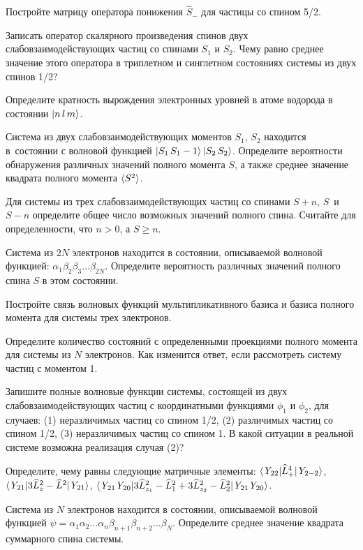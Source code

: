 \par
{} Постройте матрицу оператора понижения $\widehat{S}_{-}$ для частицы со спином 5/2.
\par
{} Записать оператор скалярного произведения спинов двух слабовзаимодействующих частиц со спинами $S_1$ и $S_2$. Чему равно среднее значение этого оператора в триплетном и синглетном состояниях системы из двух спинов 1/2?
\par
{} Определите кратность вырождения электронных уровней в атоме водорода в состоянии $\ket{n\,l\,m} $.
\par
{} Система из двух слабовзаимодействующих моментов $S_1$, $S_2$ находится в~состоянии с волновой функцией $\ket{S_1\,S_1-1}\ket{S_2\,S_2}$. Определите вероятности обнаружения различных значений полного момента $S$, а также среднее значение квадрата полного момента $\braket{S^2}$.
\par
{} Для системы из трех слабовзаимодействующих частиц со спинами $S + n$, $S$~и~$S - n$ определите общее число возможных значений полного спина. Считайте для определенности, что $n > 0$, а $S \geq n$.
\par
{} Система из $2N$ электронов находится в состоянии, описываемой волновой функцией: $\alpha_1\beta_2\beta_3 \ldots \beta_{2N}$. Определите вероятность различных значений полного спина $S$ в этом состоянии.
\par
{} Постройте связь волновых функций мультипликативного базиса и базиса полного момента для системы трех электронов.
\par
{} Определите количество состояний с определенными проекциями полного момента для системы из $N$ электронов. Как изменится ответ, если рассмотреть систему частиц с моментом 1.
\par
{} Запишите полные волновые функции системы, состоящей из двух слабовзаимодействующих частиц с координатными функциями $\phi_1$ и $\phi_2$, для случаев: (1) неразличимых частиц со спином 1/2, (2) различимых частиц со спином 1/2, (3) неразличимых частиц со спином 1. В какой ситуации в реальной системе возможна реализация случая (2)?
\par
{} Определите, чему равны следующие матричные элементы: $\braket{\textit{Y}_{22}|\widehat L^4_+|\textit{Y}_{2-2}}$, $\braket{\textit{Y}_{21}|3\widehat L_{z}^2- \widehat L^2|\textit{Y}_{21}}$, $\braket{\textit{Y}_{21}\textit{Y}_{20}|3 \widehat L_{z_1}^2- \widehat L_1^2+3 \widehat L_{z_2}^2- \widehat L_2^2|\textit{Y}_{21}\textit{Y}_{20}}$.
\par
{} Система из $N$ электронов находится в состоянии, описываемой волновой функцией $\psi=\alpha_1\alpha_2 \ldots \alpha_n\beta_{n+1}\beta_{n+2} \ldots \beta_{N}$. Определите среднее значение квадрата суммарного спина системы.
\par
